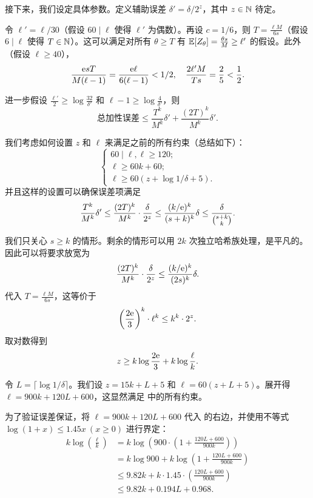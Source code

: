 接下来，我们设定具体参数。定义辅助误差 $\delta' = \delta / 2^z$，其中 $z \in \mathbb{N}$ 待定。

令 $\ell' = \ell / 30$（假设 $60 \mid \ell$ 使得 $\ell'$ 为偶数）。再设 $c = 1 / 6$，则 $T = \frac{\ell M}{6 s}$（假设 $6 \mid \ell$ 使得 $T \in \mathbb{N}$）。这可以满足对所有 $\theta \ge T$ 有 $\operatorname*{\mathbb{E}}[Z_\theta] = \frac{\theta s}{M} \ge \ell'$ 的假设。此外（假设 $\ell \ge 40$），
$$
\frac{\mathrm{e} s T}{M (\ell - 1)} = \frac{\mathrm{e} \ell}{6 (\ell - 1)} < 1/2, \quad \frac{2 \ell' M}{T s} = \frac{2}{5} < \frac{1}{2}.
$$

进一步假设 $\frac{\ell' }{2} \ge \log \frac{32}{\delta'}$ 和 $\ell - 1 \ge \log \frac{4}{\delta'}$，则
$$
\text{总加性误差} \le \frac{T^k}{M^k} \delta' + \frac{(2 T)^k}{M^k} \delta'.
$$

我们考虑如何设置 $z$ 和 $\ell$ 来满足之前的所有约束（总结如下）：
\begin{equation}\label{eq:constraints}
    \begin{cases}
        60 \mid \ell, \ell \ge 120; \\
        \ell \ge 60 k + 60; \\
        \ell \ge 60 (z + \log 1 / \delta + 5).
    \end{cases}
\end{equation}
并且这样的设置可以确保误差项满足
$$
\frac{T^k}{M^k} \delta' \le \frac{(2 T)^k}{M^k} \cdot \frac{\delta}{2^z} \le \frac{(k / \mathrm{e})^k}{(s + k)^k} \delta \le \frac{\delta}{\binom{s + k}{k}}.
$$

我们只关心 $s \ge k$ 的情形。剩余的情形可以用 $2k$ 次独立哈希族处理，是平凡的。因此可以将要求放宽为
$$
\frac{(2 T)^k}{M^k} \cdot \frac{\delta}{2^z} \le \frac{(k / \mathrm{e})^k}{(2 s)^k} \delta.
$$
代入 $T = \frac{\ell M}{6 s}$，这等价于
$$
\left( \frac{2 \mathrm{e}}{3} \right)^k \cdot \ell^k \le k^k \cdot 2^z.
$$
取对数得到
\begin{equation}\label{eq:z_ell_relation}
    z \ge k \log \frac{2 \mathrm{e}}{3} + k \log \frac{\ell}{k}.
\end{equation}

令 $L = \lceil \log 1 / \delta \rceil$。我们设 $z = 15 k + L + 5$ 和 $\ell = 60 (z + L + 5)$。展开得 $\ell = 900k + 120L + 600$，这显然满足  中的所有约束。

为了验证误差保证，将 $\ell = 900k + 120L + 600$ 代入  的右边，并使用不等式 $\log(1+x) \le 1.45 x\ (x \ge 0)$ 进行界定：
\begin{align*}
    k \log\left( \frac{\ell}{k} \right) &= k \log\left( 900 \cdot \left( 1 + \frac{120L + 600}{900k} \right) \right) \\
    &= k \log 900 + k \log\left( 1 + \frac{120L + 600}{900k} \right) \\
    &\le 9.82 k + k \cdot 1.45 \cdot \left(\frac{120L + 600}{900k}\right) \\
    &\le 9.82 k + 0.194 L + 0.968.
\end{align*}

